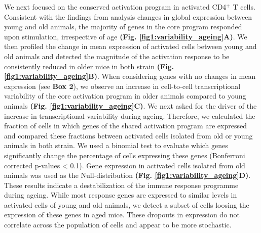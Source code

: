 We next focused on the conserved activation program in activated CD4$^+$ T cells. Consistent with the findings from analysis changes in global expression between young and old animals,  the majority of genes in the core program responded upon stimulation, irrespective of age \textbf{(Fig. \ref{fig1:variability_ageing}A)}. We then profiled the change in mean expression of activated cells between young and old animals and detected the magnitude of the activation response to be consistently reduced in older mice in both strain \textbf{(Fig. \ref{fig1:variability_ageing}B)}. When considering genes with no changes in mean expression (see \textbf{Box 2}), we observe an increase in cell-to-cell transcriptional variability of the core activation program in older animals compared to young animals \textbf{(Fig. \ref{fig1:variability_ageing}C)}. We next asked for the driver of the increase in transcriptional variability during ageing. Therefore, we calculated the fraction of cells in which genes of the shared activation program are expressed and compared these fractions between activated cells isolated from old or young animals in both strain. We used a binomial test to evaluate which genes significantly change the percentage of cells expressing these genes (Bonferroni corrected p-values < 0.1). Gene expression in activated cells isolated from old animals was used as the Null-distribution \textbf{(Fig. \ref{fig1:variability_ageing}D)}. \\

These results indicate a destabilization of the immune response programme during ageing. While most response genes are expressed to similar levels in activated cells of young and old animals, we detect a subset of cells loosing the expression of these genes in aged mice. These dropouts in expression do not correlate across the population of cells and appear to be more stochastic.

\newpage

